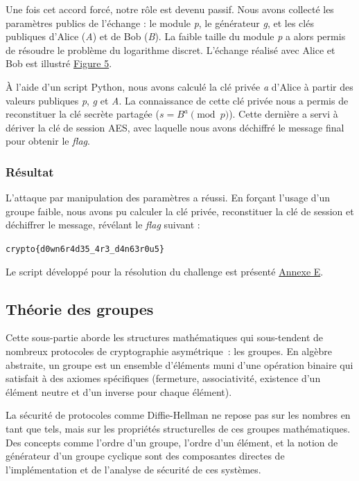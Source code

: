     Une fois cet accord forcé, notre rôle est devenu passif. Nous avons
    collecté les paramètres publics de l'échange : le module \textit{p}, le
    générateur \textit{g}, et les clés publiques d'Alice (\textit{A}) et de
    Bob (\textit{B}). La faible taille du module \textit{p} a alors permis de
    résoudre le problème du logarithme discret. L'échange réalisé avec Alice et Bob est illustré \hyperref[fig:mitmChallenge]{Figure 5}. 
    
    À l'aide d'un script Python, nous
    avons calculé la clé privée \textit{a} d'Alice à partir des valeurs publiques
    \textit{p}, \textit{g} et \textit{A}. La connaissance de cette clé privée nous a permis de reconstituer la clé
    secrète partagée ($s = B^a \pmod{p}$). Cette dernière a servi à dériver la
    clé de session AES, avec laquelle nous avons déchiffré le message final
    pour obtenir le \textit{flag}.

    \subsubsection{Résultat}
    L'attaque par manipulation des paramètres a réussi. En forçant l'usage d'un
    groupe faible, nous avons pu calculer la clé privée, reconstituer la clé de
    session et déchiffrer le message, révélant le \textit{flag} suivant :

    \begin{center}
        \texttt{crypto\{d0wn6r4d35\_4r3\_d4n63r0u5\}}
    \end{center}

    Le script développé pour la résolution du challenge est présenté \hyperref[annexe:script-exportgrade]{Annexe E}.

    \subsection{Théorie des groupes}
    Cette sous-partie aborde les structures mathématiques qui sous-tendent de
    nombreux protocoles de cryptographie asymétrique~: les groupes. En
    algèbre abstraite, un groupe est un ensemble d'éléments muni d'une
    opération binaire qui satisfait à des axiomes spécifiques (fermeture,
    associativité, existence d'un élément neutre et d'un inverse pour chaque
    élément).

    La sécurité de protocoles comme Diffie-Hellman ne repose pas sur les
    nombres en tant que tels, mais sur les propriétés structurelles de ces
    groupes mathématiques. Des concepts comme l'ordre d'un groupe, l'ordre
    d'un élément, et la notion de générateur d'un groupe
    cyclique sont des composantes directes de l'implémentation et de
    l'analyse de sécurité de ces systèmes.

